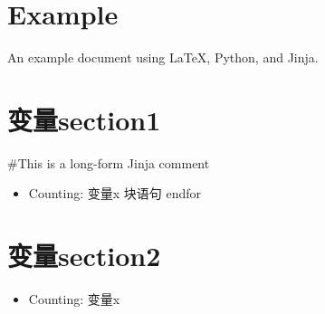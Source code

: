 \documentclass[UTF8]{ctexart}
\newcommand{\BLOCK}[1]{块语句#1}
\newcommand{\VAR}[1]{变量#1}
\begin{document}
\section{Example}
An example document using \LaTeX, Python, and Jinja.
\section{\VAR{section1}}
\#{This is a long-form Jinja comment}
\begin{itemize}
    \BLOCK{ for x in range(0, 3) }
    \item Counting: \VAR{x}
          \BLOCK{ endfor }
\end{itemize}
\section{\VAR{section2}}
\begin{itemize}
    \item Counting: \VAR{x}
\end{itemize}
\end{document}
